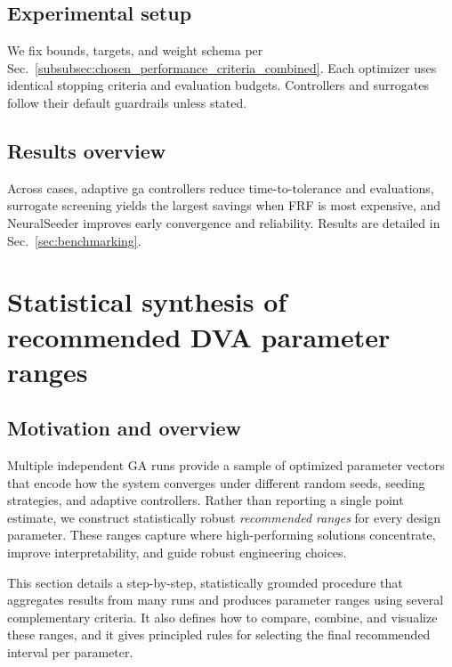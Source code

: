 \documentclass[12pt,a4paper]{article}
\begin{document}
\subsection{Experimental setup}
We fix bounds, targets, and weight schema per Sec.~\ref{subsubsec:chosen_performance_criteria_combined}. Each optimizer uses identical stopping criteria and evaluation budgets. Controllers and surrogates follow their default guardrails unless stated.

\subsection{Results overview}
Across cases, adaptive \gls{ga} controllers reduce time-to-tolerance and evaluations, surrogate screening yields the largest savings when FRF is most expensive, and NeuralSeeder improves early convergence and reliability. Results are detailed in Sec.~\ref{sec:benchmarking}.

\section{Statistical synthesis of recommended DVA parameter ranges}
\label{sec:statistical-ranges}

\subsection{Motivation and overview}
Multiple independent GA runs provide a sample of optimized parameter vectors that encode how the system converges under different random seeds, seeding strategies, and adaptive controllers. Rather than reporting a single point estimate, we construct statistically robust \emph{recommended ranges} for every design parameter. These ranges capture where high-performing solutions concentrate, improve interpretability, and guide robust engineering choices.

This section details a step-by-step, statistically grounded procedure that aggregates results from many runs and produces parameter ranges using several complementary criteria. It also defines how to compare, combine, and visualize these ranges, and it gives principled rules for selecting the final recommended interval per parameter.
\end{document}
